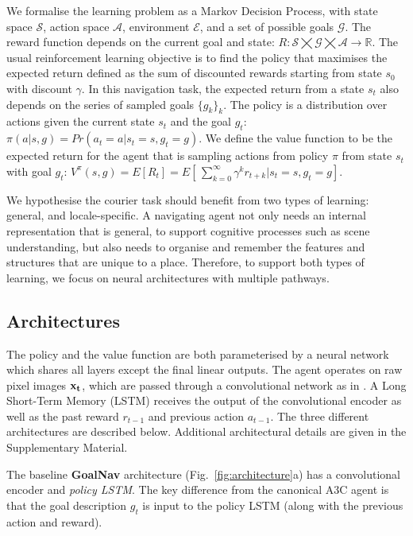 \label{sec:problem}
We formalise the learning problem as a Markov Decision Process, with
state space $\mathcal{S}$, action space $\mathcal{A}$, environment $\mathcal{E}$, and a set of possible goals $\mathcal{G}$.
The reward function depends on  the current goal and state: $R: \mathcal{S} \bigtimes \mathcal{G} \bigtimes \mathcal{A} \to \mathbb{R}$. 
The usual reinforcement learning objective is to find the policy that maximises the expected return defined as the sum of discounted rewards starting from state $s_0$ with discount $\gamma$. 
In this navigation task, the expected return from a state $s_t$ also depends on the series of sampled goals $\{g_{k}\}_k$. The policy is a distribution over actions given the current state $s_t$ and the goal $g_t$: $\pi(a|s,g) = Pr(a_t=a |s_t=s, g_t=g)$. We define the value function to be the expected return for the agent that is sampling actions from policy $\pi$ from state $s_t$ with goal $g_t$:  $V^{\pi}(s,g)=E[R_t]= E[\, \sum_{k=0}^{\infty} \gamma^k r_{t+k} |s_t=s,g_t=g]$.


We hypothesise the courier task should benefit from two types of learning: general, and locale-specific. A navigating agent not only needs an internal representation that is general, to support cognitive processes such as scene understanding, but also needs to organise and remember the features and structures that are unique to a place. Therefore, to support both types of learning,
we focus on  neural architectures with multiple pathways. 

\subsection{Architectures}
\label{sec:architecture}


The policy and the value function are both parameterised by a neural network which shares all layers except the final linear outputs. The agent operates on raw pixel images ${\bf x_t}$, which are passed through a convolutional network as in \cite{mnih2016asynchronous}. A Long Short-Term Memory (LSTM) \cite{hochreiter1997long} receives the output of the convolutional encoder as well as the past reward $r_{t-1}$ and previous action $a_{t-1}$.  The three different architectures are described below. Additional architectural details are given in the Supplementary Material.

The baseline {\bf GoalNav} architecture (Fig.~\ref{fig:architecture}a) has a convolutional encoder and \emph{policy LSTM}. The key difference from the canonical A3C agent \cite{mnih2016asynchronous} is that the goal description $g_t$ is input to the policy LSTM (along with the previous action and reward).
    
